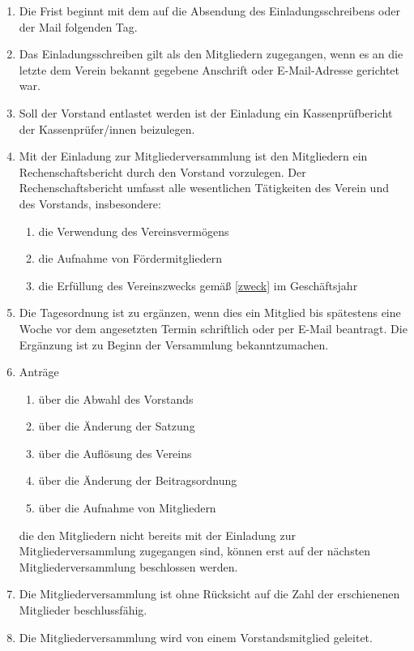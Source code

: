 \documentclass[german]{article}
\begin{document}
\begin{enumerate}
\begin{enumerate}
\item Die Frist beginnt mit dem auf die Absendung des Einladungsschreibens oder der Mail folgenden Tag.

\item Das Einladungsschreiben gilt als den Mitgliedern zugegangen, wenn es an die letzte dem Verein bekannt gegebene Anschrift oder E-Mail-Adresse gerichtet war.

\item Soll der Vorstand entlastet werden ist der Einladung ein Kassenprüfbericht der Kassenprüfer/innen beizulegen.

\item Mit der Einladung zur Mitgliederversammlung ist den Mitgliedern ein Rechenschaftsbericht durch den Vorstand vorzulegen.
Der Rechenschaftsbericht umfasst alle wesentlichen Tätigkeiten des Verein und des Vorstands, insbesondere:
\begin{enumerate}
\item die Verwendung des Vereinsvermögens
\item die Aufnahme von Fördermitgliedern
\item die Erfüllung des Vereinszwecks gemäß \ref{zweck} im Geschäftsjahr
\end{enumerate}

\item Die Tagesordnung ist zu ergänzen, wenn dies ein Mitglied bis spätestens eine Woche vor dem angesetzten Termin schriftlich oder per E-Mail beantragt.
Die Ergänzung ist zu Beginn der Versammlung bekanntzumachen.

\item Anträge
\begin{enumerate}
\item über die Abwahl des Vorstands
\item über die Änderung der Satzung
\item über die Auflösung des Vereins
\item über die Änderung der Beitragsordnung
\item über die Aufnahme von Mitgliedern
\end{enumerate}
die den Mitgliedern nicht bereits mit der Einladung zur Mitgliederversammlung zugegangen sind, können erst auf der nächsten Mitgliederversammlung beschlossen werden.

\item Die Mitgliederversammlung ist ohne Rücksicht auf die Zahl der erschienenen Mitglieder beschlussfähig.

\item Die Mitgliederversammlung wird von einem Vorstandsmitglied geleitet.


\end{enumerate}
\end{enumerate}
\end{document}
